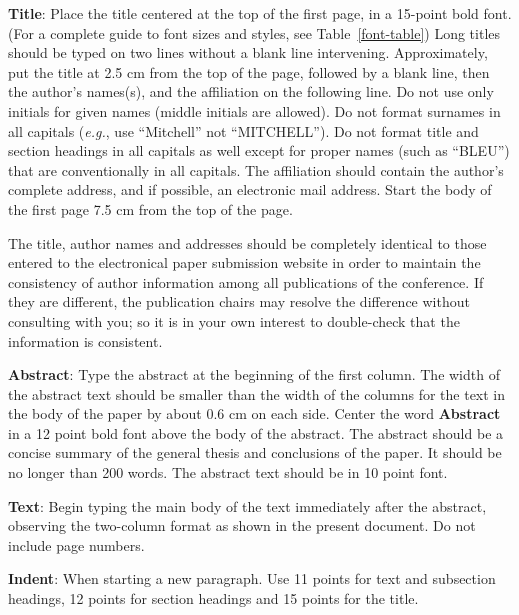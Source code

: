 \documentclass[11pt,a4paper]{article}
\begin{document}
{\bf Title}: Place the title centered at the top of the first page, in
a 15-point bold font. (For a complete guide to font sizes and styles,
see Table~\ref{font-table}) Long titles should be typed on two lines
without a blank line intervening. Approximately, put the title at 2.5
cm from the top of the page, followed by a blank line, then the
author's names(s), and the affiliation on the following line. Do not
use only initials for given names (middle initials are allowed). Do
not format surnames in all capitals ({\em e.g.}, use ``Mitchell'' not
``MITCHELL'').  Do not format title and section headings in all
capitals as well except for proper names (such as ``BLEU'') that are
conventionally in all capitals.  The affiliation should contain the
author's complete address, and if possible, an electronic mail
address. Start the body of the first page 7.5 cm from the top of the
page.

The title, author names and addresses should be completely identical
to those entered to the electronical paper submission website in order
to maintain the consistency of author information among all
publications of the conference. If they are different, the publication
chairs may resolve the difference without consulting with you; so it
is in your own interest to double-check that the information is
consistent.

{\bf Abstract}: Type the abstract at the beginning of the first
column. The width of the abstract text should be smaller than the
width of the columns for the text in the body of the paper by about
0.6 cm on each side. Center the word {\bf Abstract} in a 12 point bold
font above the body of the abstract. The abstract should be a concise
summary of the general thesis and conclusions of the paper. It should
be no longer than 200 words. The abstract text should be in 10 point font.

{\bf Text}: Begin typing the main body of the text immediately after
the abstract, observing the two-column format as shown in 
the present document. Do not include page numbers.

{\bf Indent}: When starting a new paragraph. Use 11 points for text and 
subsection headings, 12 points for section headings and 15 points for
the title. 
\end{document}
